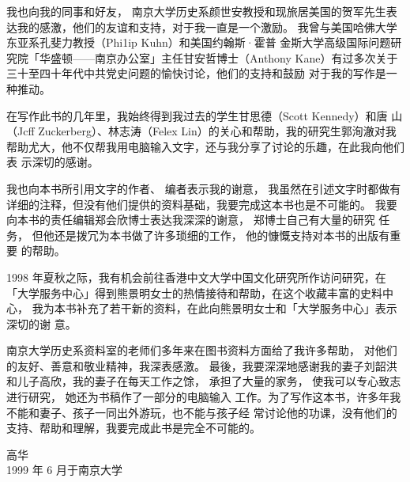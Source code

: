 \begin{preface}
我也向我的同事和好友，
南京大学历史系颜世安教授和现旅居美国的贺军先生表
达我的感激，他们的友谊和支持，对于我一直是一个激励。
我曾与美国哈佛大学东亚系孔斐力教授（Phi1ip
Kuhn）和美国约翰斯·霍普
金斯大学高级国际问题研究院「华盛顿——南京办公室」主任甘安哲博士（Anthony
Kane）有过多次关于三十至四十年代中共党史问题的愉快讨论，他们的支持和鼓励
对于我的写作是一种推动。

在写作此书的几年里，我始终得到我过去的学生甘思德（Scott
Kennedy）和唐
山（Jcff Zuckerberg）、林志涛（Felex Lin）的关心和帮助，我的研究生郭洵澈对我
帮助尤大，他不仅帮我用电脑输入文字，还与我分享了讨论的乐趣，在此我向他们表
示深切的感谢。

我也向本书所引用文字的作者、
编者表示我的谢意，
我虽然在引述文字时都做有
详细的注释，但没有他们提供的资料基础，我要完成这本书也是不可能的。
我要向本书的责任编辑郑会欣博士表达我深深的谢意，
郑博士自己有大量的研究
任务，
但他还是拨冗为本书做了许多琐细的工作，
他的慷慨支持对本书的出版有重要
的帮助。

1998 年夏秋之际，我有机会前往香港中文大学中国文化研究所作访问研究，在
「大学服务中心」得到熊景明女士的热情接待和帮助，在这个收藏丰富的史料中心，
我为本书补充了若干新的资料，在此向熊景明女士和「大学服务中心」表示深切的谢
意。

南京大学历史系资料室的老师们多年来在图书资料方面给了我许多帮助，
对他们
的友好、善意和敬业精神，我深表感激。
最後，我要深深地感谢我的妻子刘韶洪和儿子高欣，我的妻子在每天工作之馀，
承担了大量的家务，
使我可以专心致志进行研究，
她还为书稿作了一部分的电脑输入
工作。为了写作这本书，许多年我不能和妻子、孩子一同出外游玩，也不能与孩子经
常讨论他的功课，没有他们的支持、帮助和理解，我要完成此书是完全不可能的。

{\bigskip\mbox{}\large\hfill  高华\qquad\qquad\qquad\\
\bigskip\mbox{}\large\hfill 
1999 年 6 月于南京大学}

\end{preface}
